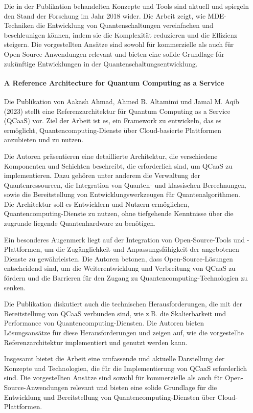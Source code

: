 Die in der Publikation behandelten Konzepte und Tools sind aktuell und spiegeln den Stand der Forschung im Jahr 2018 wider. 
Die Arbeit zeigt, wie MDE-Techniken die Entwicklung von Quantenschaltungen vereinfachen und beschleunigen können, indem 
sie die Komplexität reduzieren und die Effizienz steigern. Die vorgestellten Ansätze sind sowohl für 
kommerzielle als auch für Open-Source-Anwendungen relevant und bieten eine solide Grundlage für zukünftige Entwicklungen in der Quantenschaltungsentwicklung.

\paragraph{A Reference Architecture for Quantum Computing as a Service}

Die Publikation von Aakash Ahmad, Ahmed B. Altamimi und Jamal M. Aqib (2023) stellt eine Referenzarchitektur 
für Quantum Computing as a Service (QCaaS) vor. Ziel der Arbeit ist es, ein Framework zu entwickeln, das es ermöglicht, 
Quantencomputing-Dienste über Cloud-basierte Plattformen anzubieten und zu nutzen.

Die Autoren präsentieren eine detaillierte Architektur, die verschiedene Komponenten und Schichten beschreibt, 
die erforderlich sind, um QCaaS zu implementieren. Dazu gehören unter anderem die Verwaltung der 
Quantenressourcen, die Integration von Quanten- und klassischen Berechnungen, sowie die Bereitstellung von 
Entwicklungswerkzeugen für Quantenalgorithmen. Die Architektur soll es Entwicklern und Nutzern 
ermöglichen, Quantencomputing-Dienste zu nutzen, ohne tiefgehende Kenntnisse über die zugrunde liegende Quantenhardware zu benötigen.

Ein besonderes Augenmerk liegt auf der Integration von Open-Source-Tools und -Plattformen, um die 
Zugänglichkeit und Anpassungsfähigkeit der angebotenen Dienste zu gewährleisten. Die Autoren betonen, 
dass Open-Source-Lösungen entscheidend sind, um die Weiterentwicklung und Verbreitung von QCaaS zu fördern und die 
Barrieren für den Zugang zu Quantencomputing-Technologien zu senken.

Die Publikation diskutiert auch die technischen Herausforderungen, die mit der Bereitstellung von QCaaS verbunden sind, 
wie z.B. die Skalierbarkeit und Performance von Quantencomputing-Diensten. Die Autoren bieten Lösungsansätze für diese 
Herausforderungen und zeigen auf, wie die vorgestellte Referenzarchitektur implementiert und genutzt werden kann.

Insgesamt bietet die Arbeit eine umfassende und aktuelle Darstellung der Konzepte und Technologien, die 
für die Implementierung von QCaaS erforderlich sind. Die vorgestellten Ansätze sind sowohl für 
kommerzielle als auch für Open-Source-Anwendungen relevant und bieten eine solide Grundlage für die 
Entwicklung und Bereitstellung von Quantencomputing-Diensten über Cloud-Plattformen.

